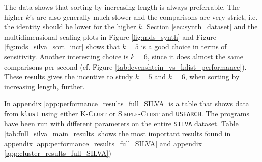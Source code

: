 The data shows that sorting by increasing length is always preferrable. The
higher $k$'s are also generally much slower and the comparisons are very
strict, i.e. the identity should be lower for the higher $k$. Section
\ref{sec:synth_dataset} and the multidimensional scaling plots in Figure
\ref{fig:mds_synth} and Figure \ref{fig:mds_silva_sort_incr} shows that $k=5$ is a
good choice in terms of sensitivity.
Another interesting choice is $k=6$, since it does almost the same comparisons
per second (cf. Figure \ref{tab:levenshtein_vs_kdist_performance}). These
results gives the incentive to study $k=5$ and $k=6$, when sorting by
increasing length, further.

In appendix \ref{app:performance_results_full_SILVA} is a table that shows data
from \texttt{klust} using either \textsc{K-Clust} or \textsc{Simple-Clust} and
\texttt{USEARCH}. The programs have been run with different parameters on the
entire \texttt{SILVA} dataset. Table \ref{tab:full_silva_main_results} shows
the most important results found in appendix
\ref{app:performance_results_full_SILVA} and appendix
\ref{app:cluster_results_full_SILVA})


